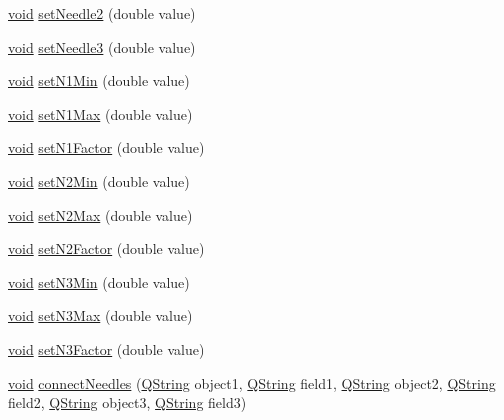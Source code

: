 \begin{DoxyCompactItemize}
\item 
\hyperlink{group___u_a_v_objects_plugin_ga444cf2ff3f0ecbe028adce838d373f5c}{void} \hyperlink{group___dial_plugin_gaeabf2ea71c12b9ce01fcc94833468297}{set\-Needle2} (double value)
\item 
\hyperlink{group___u_a_v_objects_plugin_ga444cf2ff3f0ecbe028adce838d373f5c}{void} \hyperlink{group___dial_plugin_ga7d752a6892e2e93299793b455723fe7e}{set\-Needle3} (double value)
\item 
\hyperlink{group___u_a_v_objects_plugin_ga444cf2ff3f0ecbe028adce838d373f5c}{void} \hyperlink{group___dial_plugin_ga9e1d1e6690a126b564e4058c5c9a1757}{set\-N1\-Min} (double value)
\item 
\hyperlink{group___u_a_v_objects_plugin_ga444cf2ff3f0ecbe028adce838d373f5c}{void} \hyperlink{group___dial_plugin_ga1686d1c9510998c11ce174fb20a785e1}{set\-N1\-Max} (double value)
\item 
\hyperlink{group___u_a_v_objects_plugin_ga444cf2ff3f0ecbe028adce838d373f5c}{void} \hyperlink{group___dial_plugin_ga8b964189b1a31516fd976319be2c820c}{set\-N1\-Factor} (double value)
\item 
\hyperlink{group___u_a_v_objects_plugin_ga444cf2ff3f0ecbe028adce838d373f5c}{void} \hyperlink{group___dial_plugin_gacbefbb82b1a0a45dd4ac2b96888680d8}{set\-N2\-Min} (double value)
\item 
\hyperlink{group___u_a_v_objects_plugin_ga444cf2ff3f0ecbe028adce838d373f5c}{void} \hyperlink{group___dial_plugin_ga137f9d887b4877446af21bc388fea524}{set\-N2\-Max} (double value)
\item 
\hyperlink{group___u_a_v_objects_plugin_ga444cf2ff3f0ecbe028adce838d373f5c}{void} \hyperlink{group___dial_plugin_gacd0d92d28bdad1d9142edc01753adc0f}{set\-N2\-Factor} (double value)
\item 
\hyperlink{group___u_a_v_objects_plugin_ga444cf2ff3f0ecbe028adce838d373f5c}{void} \hyperlink{group___dial_plugin_ga0b4a5fbf9c6dcd1f01bd6efff7cc3c26}{set\-N3\-Min} (double value)
\item 
\hyperlink{group___u_a_v_objects_plugin_ga444cf2ff3f0ecbe028adce838d373f5c}{void} \hyperlink{group___dial_plugin_gaa3a290185da85f7cd228c785ca2b6cc1}{set\-N3\-Max} (double value)
\item 
\hyperlink{group___u_a_v_objects_plugin_ga444cf2ff3f0ecbe028adce838d373f5c}{void} \hyperlink{group___dial_plugin_gad8af67c2847f49c9c2dce641d7105f18}{set\-N3\-Factor} (double value)
\item 
\hyperlink{group___u_a_v_objects_plugin_ga444cf2ff3f0ecbe028adce838d373f5c}{void} \hyperlink{group___dial_plugin_ga4b039739f70d00651a6ca39cf5a1997a}{connect\-Needles} (\hyperlink{group___u_a_v_objects_plugin_gab9d252f49c333c94a72f97ce3105a32d}{\-Q\-String} object1, \hyperlink{group___u_a_v_objects_plugin_gab9d252f49c333c94a72f97ce3105a32d}{\-Q\-String} field1, \hyperlink{group___u_a_v_objects_plugin_gab9d252f49c333c94a72f97ce3105a32d}{\-Q\-String} object2, \hyperlink{group___u_a_v_objects_plugin_gab9d252f49c333c94a72f97ce3105a32d}{\-Q\-String} field2, \hyperlink{group___u_a_v_objects_plugin_gab9d252f49c333c94a72f97ce3105a32d}{\-Q\-String} object3, \hyperlink{group___u_a_v_objects_plugin_gab9d252f49c333c94a72f97ce3105a32d}{\-Q\-String} field3)

\end{DoxyCompactItemize}
